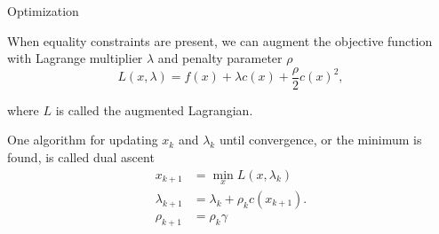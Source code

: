 \begin{frame}{Optimization} 

    When equality constraints are present, we can augment the objective function with Lagrange multiplier $ \lambda $ and penalty parameter $\rho$
% 
    \begin{equation}
        L(x, \lambda) = f(x) + \lambda c(x) + \frac{\rho}{2} c(x)^2, 
    \end{equation} 

    where $L$ is called the augmented Lagrangian. 

% 
    One algorithm for updating $x_k$ and $\lambda_k$ until convergence, or the minimum is found, is called dual ascent 
% 
    \begin{align}
        x_{k+1}         & = \min_x L(x, \lambda_k) \\ 
        \lambda_{k+1}   & = \lambda_k + \rho_k c(x_{k+1}) . \label{eq:eq_update} \\ 
        \rho_{k+1}      & = \rho_k \gamma 
    \end{align}


    
\end{frame} 

